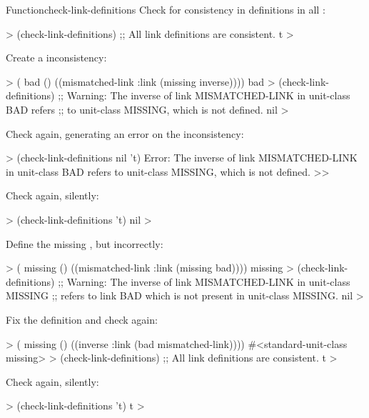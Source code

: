 \documentclass[10pt,twoside,english,pdftex]{article}
\begin{document}
\begin{functiondoc}{Function}{check-link-definitions}{%
    }
\fnexamples 
%
Check for consistency in  definitions in all
:
%
\W\supp
\begin{example}
  > (check-link-definitions)
  ;; All link definitions are consistent.
  t
  >
\end{example}
%
%
%
Create a  inconsistency:
%
\W\supp\notpretop
\begin{example}
  > ( bad () 
       ((mismatched-link :link (missing inverse))))
  bad
  > (check-link-definitions)
  ;; Warning: The inverse of link MISMATCHED-LINK in unit-class BAD refers
  ;;          to unit-class MISSING, which is not defined.
  nil
  >
\end{example}
%
Check again, generating an error on the inconsistency:
%
\W\supp\notpretop
\begin{example}
  > (check-link-definitions nil 't)
  Error: The inverse of link MISMATCHED-LINK in unit-class BAD refers
         to unit-class MISSING, which is not defined.
  >>
\end{example}
%
Check again, silently:
%
\W\supp\notpretop
\begin{example}
  > (check-link-definitions 't)
  nil
  >\goodpagebreak
\end{example}
%
Define the missing , but incorrectly:
%
\W\supp\notpretop
\begin{example}
  > ( missing () ((mismatched-link :link (missing bad))))
  missing
  > (check-link-definitions)
  ;; Warning: The inverse of link MISMATCHED-LINK in unit-class MISSING
  ;;          refers to link BAD which is not present in unit-class MISSING.
  nil
  >
\end{example}
%
Fix the definition and check again:
%
\W\supp\notpretop
\begin{example}
  > ( missing () ((inverse :link (bad mismatched-link))))
  #<standard-unit-class missing>
  > (check-link-definitions)
  ;; All link definitions are consistent.
  t
  >
\end{example}
%
Check again, silently:
%
\W\supp\notpretop
\begin{example}
  > (check-link-definitions 't)
  t
  > 
\end{example}

\end{functiondoc}

\end{document}
